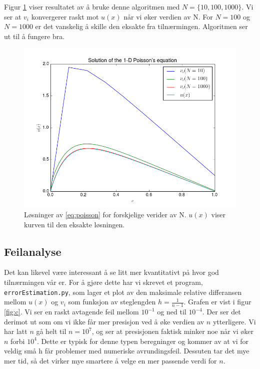\documentclass[11pt]{article}
\begin{document}
Figur \ref{fig:b} viser resultatet av å bruke denne algoritmen med
$N = \{10,100,1000\}$. Vi ser at $v_i$ konvergerer raskt mot $u(x)$
når vi øker verdien av N. For $N=100$ og $N=1000$ er det vanskelig å
skille den eksakte fra tilnærmingen. Algoritmen ser ut til å fungere bra.

\begin{figure}[ht]
  \centering
  \includegraphics[scale=0.7]{fig/b.png}
  \caption{\label{fig:b} Løsninger av \eqref{eq:poisson} for
    forskjelige verider av N. $u(x)$ viser kurven til den eksakte løsningen.}
\end{figure}

\subsection{Feilanalyse}
Det kan likevel være interessant å se litt mer kvantitativt på hvor
god tilnærmingen vår er. For å gjøre dette har vi skrevet et program,
\texttt{errorEstimation.py}, som lager et plot av den maksimale
relative differansen mellom $u(x)$ og $v_i$ som funksjon av
steglengden $h = \frac{ 1 }{ n-1 }$. Grafen er vist i figur
\ref{fig:c}. Vi ser en raskt avtagende feil mellom $10^{-1}$ og ned
til $10^{-4}$. Der ser det derimot ut som om vi ikke får mer presisjon
ved å øke verdien av $n$ ytterligere. Vi har latt $n$ gå helt til
$n=10^7$, og ser at presisjonen faktisk minker noe når vi øker $n$
forbi $10^4$. Dette er typisk for denne typen beregninger og kommer av at vi for veldig små h får problemer
med numeriske avrundingsfeil. Dessuten tar det mye mer tid,
så det virker mye smartere å velge en mer passende verdi for $n$. 
\end{document}
